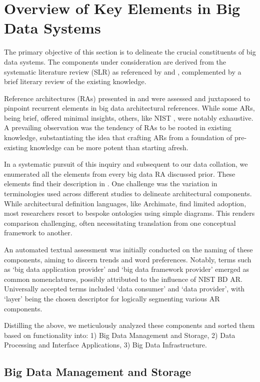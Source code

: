 \documentclass[conference]{IEEEtran}
\begin{document}
\section{Overview of Key Elements in Big Data Systems}

The primary objective of this section is to delineate the crucial constituents of big data systems. The components under consideration are derived from the systematic literature review (SLR) as referenced by \cite{b1} and \cite{b2}, complemented by a brief literary review of the existing knowledge.

Reference architectures (RAs) presented in \cite{b1} and \cite{b2} were assessed and juxtaposed to pinpoint recurrent elements in big data architectural references. While some ARs, being brief, offered minimal insights, others, like NIST \cite{b3}, were notably exhaustive. A prevailing observation was the tendency of RAs to be rooted in existing knowledge, substantiating the idea that crafting ARs from a foundation of pre-existing knowledge can be more potent than starting afresh.

In a systematic pursuit of this inquiry and subsequent to our data collation, we enumerated all the elements from every big data RA discussed prior. These elements find their description in \cite{b2}. One challenge was the variation in terminologies used across different studies to delineate architectural components. While architectural definition languages, like Archimate, find limited adoption, most researchers resort to bespoke ontologies using simple diagrams. This renders comparison challenging, often necessitating translation from one conceptual framework to another.

An automated textual assessment was initially conducted on the naming of these components, aiming to discern trends and word preferences. Notably, terms such as ‘big data application provider’ and ‘big data framework provider’ emerged as common nomenclatures, possibly attributed to the influence of NIST BD AR. Universally accepted terms included ‘data consumer’ and ‘data provider’, with ‘layer’ being the chosen descriptor for logically segmenting various AR components.

Distilling the above, we meticulously analyzed these components and sorted them based on functionality into: 1) Big Data Management and Storage, 2) Data Processing and Interface Applications, 3) Big Data Infrastructure.

\subsection{Big Data Management and Storage}
\end{document}
